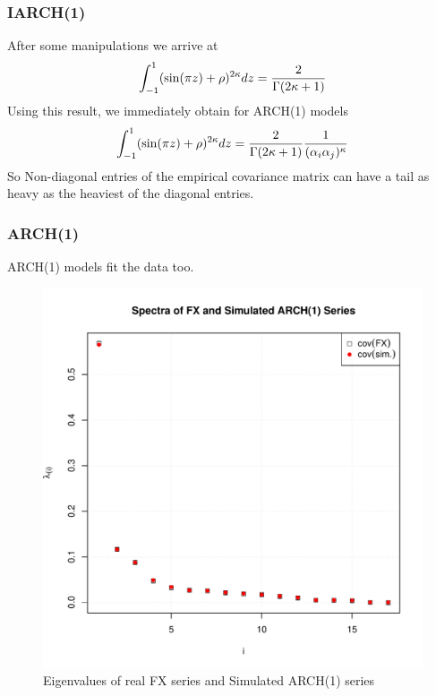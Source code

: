 \documentclass{beamer}
\begin{document}
\begin{frame}
  \frametitle{IARCH(1)}
  After some manipulations we arrive at
  \begin{equation}
    \int_{-1}^1 (\sin(\pi z) + \rho)^{2\kappa} dz = {2 \over \Gamma(2\kappa + 1)}
  \end{equation}
  Using this result, we immediately obtain for ARCH(1) models
  \begin{equation*}
    \int_{-1}^1 (\sin(\pi z) + \rho)^{2\kappa} dz =
    {2 \over \Gamma(2\kappa + 1)}
    {1 \over (\alpha_{i} \alpha_{j})^\kappa}
  \end{equation*}
  So Non-diagonal entries of the empirical covariance matrix can have
  a tail as heavy as the heaviest of the diagonal entries.
\end{frame}


\begin{frame}
  \frametitle{ARCH(1)}  
  ARCH(1) models fit the data too.
  \begin{figure}[htb!]
    \centering
    \includegraphics[scale=0.35]{FX_ARCH_eigenvalues.pdf}
    \caption{\tiny Eigenvalues of real FX series and Simulated ARCH(1) series}
  \end{figure}
\end{frame}
\end{document}
